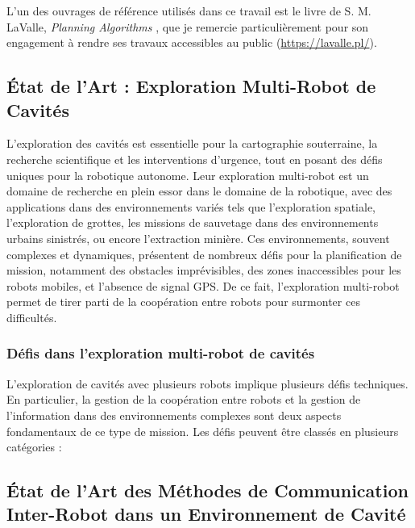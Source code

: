 \documentclass[../main.tex]{subfiles}
\begin{document}
L'un des ouvrages de référence utilisés dans ce travail est le livre de S. M. LaValle, \textit{Planning Algorithms} \cite{Lavalle_2006}, que je remercie particulièrement pour son engagement à rendre ses travaux accessibles au public ({\scriptsize \url{https://lavalle.pl/}}).

\subsection{État de l'Art : Exploration Multi-Robot de Cavités}

L'exploration des cavités est essentielle pour la cartographie souterraine, la recherche scientifique et les interventions d'urgence, tout en posant des défis uniques pour la robotique autonome.\cite{nationalgeographic_greenland_caves_2025}
Leur exploration multi-robot est un domaine de recherche en plein essor dans le domaine de la robotique, avec des applications dans des environnements variés tels que l'exploration spatiale, l'exploration de grottes, les missions de sauvetage dans des environnements urbains sinistrés, ou encore l'extraction minière.\cite{dang_2021,kambesis_2007} Ces environnements, souvent complexes et dynamiques, présentent de nombreux défis pour la planification de mission, notamment des obstacles imprévisibles, des zones inaccessibles pour les robots mobiles, et l'absence de signal GPS. De ce fait, l'exploration multi-robot permet de tirer parti de la coopération entre robots pour surmonter ces difficultés.

\subsubsection{Défis dans l'exploration multi-robot de cavités}

L'exploration de cavités avec plusieurs robots implique plusieurs défis techniques. En particulier, la gestion de la coopération entre robots et la gestion de l'information dans des environnements complexes sont deux aspects fondamentaux de ce type de mission. Les défis peuvent être classés en plusieurs catégories : 


\subsection{État de l'Art des Méthodes de Communication Inter-Robot dans un Environnement de Cavité}
\end{document}
